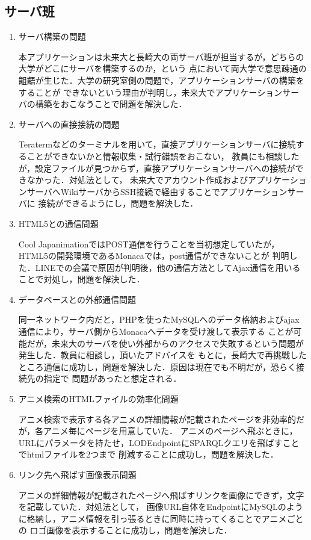 \subsection{サーバ班}
\begin{enumerate}

\item サーバ構築の問題
\par
本アプリケーションは未来大と長崎大の両サーバ班が担当するが，どちらの大学がどこにサーバを構築するのか，という
点において両大学で意思疎通の齟齬が生じた．大学の研究室側の問題で，アプリケーションサーバの構築をすることが
できないという理由が判明し，未来大でアプリケーションサーバの構築をおこなうことで問題を解決した．

\item サーバへの直接接続の問題
\par
Teratermなどのターミナルを用いて，直接アプリケーションサーバに接続することができないかと情報収集・試行錯誤をおこない，
教員にも相談したが，設定ファイルが見つからず，直接アプリケーションサーバへの接続ができなかった．対処法として，
未来大でアカウント作成およびアプリケーションサーバへWikiサーバからSSH接続で経由することでアプリケーションサーバに
接続ができるようにし，問題を解決した．

\item HTML5との通信問題
\par
Cool JapanimationではPOST通信を行うことを当初想定していたが，HTML5の開発環境であるMonacaでは，post通信ができないことが
判明した．LINEでの会議で原因が判明後，他の通信方法としてAjax通信を用いることで対処し，問題を解決した．

\item データベースとの外部通信問題
\par
同一ネットワーク内だと，PHPを使ったMySQLへのデータ格納およびajax通信により，サーバ側からMonacaへデータを受け渡して表示する
ことが可能だが，未来大のサーバを使い外部からのアクセスで失敗するという問題が発生した．教員に相談し，頂いたアドバイスを
もとに，長崎大で再挑戦したところ通信に成功し，問題を解決した．原因は現在でも不明だが，恐らく接続先の指定で
問題があったと想定される．

\item アニメ検索のHTMLファイルの効率化問題
\par
アニメ検索で表示する各アニメの詳細情報が記載されたページを非効率的だが，各アニメ毎にページを用意していた．
アニメのページへ飛ぶときに，URLにパラメータを持たせ，LODEndpointにSPARQLクエリを飛ばすことでhtmlファイルを2つまで
削減することに成功し，問題を解決した．

\item リンク先へ飛ばす画像表示問題
\par
アニメの詳細情報が記載されたページへ飛ばすリンクを画像にできず，文字を記載していた．対処法として，
画像URL自体をEndpointにMySQLのように格納し，アニメ情報を引っ張るときに同時に持ってくることでアニメごとの
ロゴ画像を表示することに成功し，問題を解決した．

\end{enumerate}
